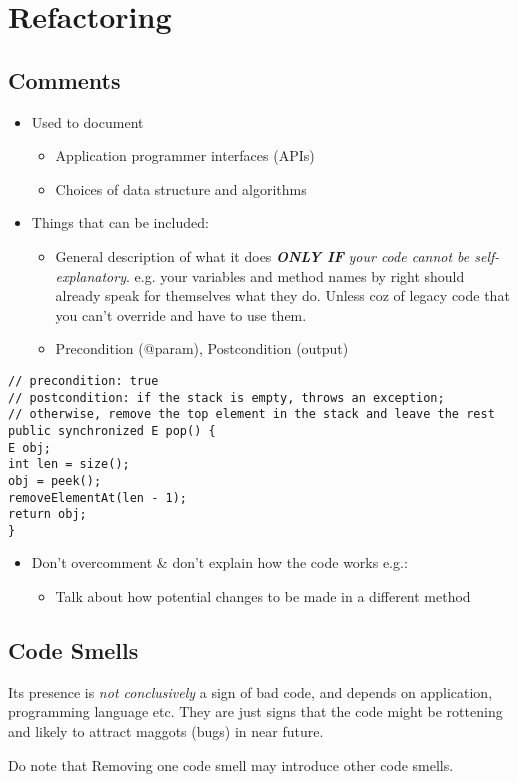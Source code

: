 \documentclass[a4paper]{article}
\begin{document}
\section{Refactoring}
\subsection{Comments}
\begin{itemize}
	\item Used to document
	\begin{itemize}[label=$\circ$]
		\item Application programmer interfaces (APIs)
		\item Choices of data structure and algorithms
	\end{itemize}
	\item Things that can be included:
	\begin{itemize}[label=$\circ$]
		\item General description of what it does \textbf{\textit{ONLY IF}} \textit{your code cannot be self-explanatory}. e.g. your variables and method names by right should already speak for themselves what they do. Unless coz of legacy code that you can't override and have to use them.
		\item Precondition (@param), Postcondition (output)
	\end{itemize}
\end{itemize}
\begin{verbatim}
// precondition: true
// postcondition: if the stack is empty, throws an exception; 
// otherwise, remove the top element in the stack and leave the rest
public synchronized E pop() {
E obj;
int len = size();
obj = peek();
removeElementAt(len - 1);
return obj;
}
\end{verbatim}
\begin{itemize}
	\item Don’t overcomment \& don't explain how the code works e.g.:
	\begin{itemize}[label=$\circ$]
		\item Talk about how potential changes to be made in a different method
	\end{itemize}
\end{itemize}
\subsection{Code Smells}
Its presence is \textit{not conclusively} a sign of bad code, and depends on application, programming language etc. They are just signs that the code might be rottening and likely to attract maggots (bugs) in near future.
\begin{displayquote}
	Do note that Removing one code smell may introduce other code smells.
\end{displayquote}
\end{document}
